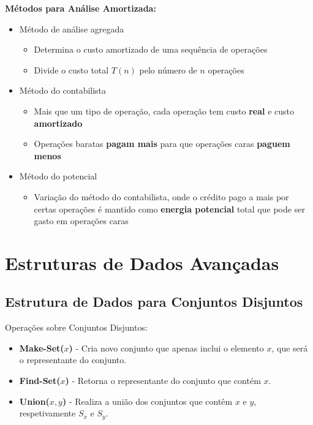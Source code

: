 \documentclass[11pt]{article}
\begin{document}
\textbf{Métodos para Análise Amortizada:}
\begin{itemize}[topsep=0pt]
    \item Método de análise agregada
          \begin{itemize}[topsep=0pt]
              \item Determina o custo amortizado de uma sequência de operações
              \item Divide o custo total $T(n)$ pelo número de $n$ operações
          \end{itemize}
    \item Método do contabilista
          \begin{itemize}[topsep=0pt]
              \item Mais que um tipo de operação, cada operação tem custo \textbf{real} e custo \textbf{amortizado}
              \item Operações baratas \textbf{pagam mais} para que operações caras \textbf{paguem menos}
          \end{itemize}
    \item Método do potencial
          \begin{itemize}[topsep=0pt]
              \item Variação do método do contabilista, onde o crédito pago a mais por certas operações é mantido como \textbf{energia potencial} total que pode ser gasto em operações caras
          \end{itemize}
\end{itemize}

\newpage

\section{Estruturas de Dados Avançadas}

\subsection{Estrutura de Dados para Conjuntos Disjuntos} 

Operações sobre Conjuntos Disjuntos:
\begin{itemize}[topsep=0pt]
    \item \textbf{Make-Set($x$)} - Cria novo conjunto que apenas inclui o elemento $x$, que será o representante do conjunto.
    \item \textbf{Find-Set($x$)} - Retorna o representante do conjunto que contém $x$.
    \item \textbf{Union($x,y$)} - Realiza a união dos conjuntos que contêm $x$ e $y$, respetivamente $S_x$ e $S_y$.
\end{itemize}
\end{document}
